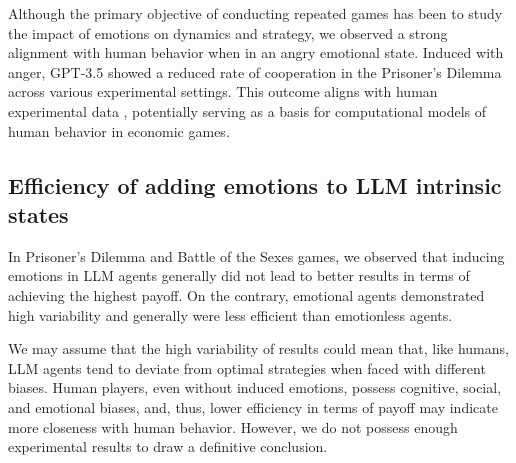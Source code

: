 \documentclass{article}
\begin{document}
Although the primary objective of conducting repeated games has been to study the impact of emotions on dynamics and strategy, we observed a strong alignment with human behavior when in an angry emotional state. Induced with anger, GPT-3.5 showed a reduced rate of cooperation in the Prisoner's Dilemma across various experimental settings. This outcome aligns with human experimental data \cite{fpsyg.2013.00469} \cite{PROTO2019209}, potentially serving as a basis for computational models of human behavior in economic games. 


\subsection{Efficiency of adding emotions to LLM intrinsic states}




In Prisoner's Dilemma and Battle of the Sexes games, we observed that inducing emotions in LLM agents generally did not lead to better results in terms of achieving the highest payoff. On the contrary, emotional agents demonstrated high variability and generally were less efficient than emotionless agents.

We may assume that the high variability of results could mean that, like humans, LLM agents tend to deviate from optimal strategies when faced with different biases. Human players, even without induced emotions, possess cognitive, social, and emotional biases, and, thus, lower efficiency in terms of payoff may indicate more closeness with human behavior. However, we do not possess enough experimental results to draw a definitive conclusion. 
\end{document}
